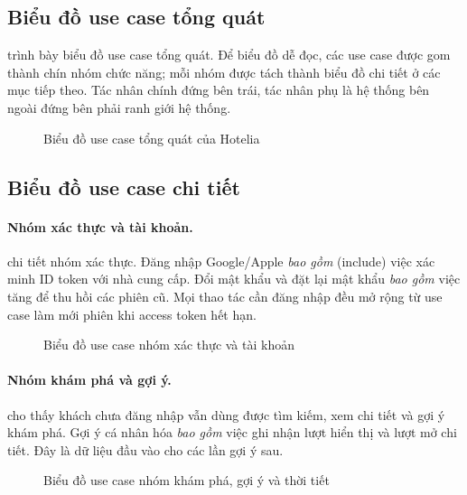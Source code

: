 \subsection{Biểu đồ use case tổng quát}

 trình bày biểu đồ use case tổng quát. Để biểu đồ dễ đọc, các use case được gom thành chín nhóm chức năng; mỗi nhóm được tách thành biểu đồ chi tiết ở các mục tiếp theo. Tác nhân chính đứng bên trái, tác nhân phụ là hệ thống bên ngoài đứng bên phải ranh giới hệ thống.

\begin{figure}[H]
\centering
{}
\caption{Biểu đồ use case tổng quát của Hotelia}\label{fig:uc-overall}
\end{figure}

\subsection{Biểu đồ use case chi tiết}

\paragraph{Nhóm xác thực và tài khoản.}  chi tiết nhóm xác thực. Đăng nhập Google/Apple \emph{bao gồm} (include) việc xác minh ID token với nhà cung cấp. Đổi mật khẩu và đặt lại mật khẩu \emph{bao gồm} việc tăng  để thu hồi các phiên cũ. Mọi thao tác cần đăng nhập đều mở rộng từ use case làm mới phiên khi access token hết hạn.

\begin{figure}[H]
\centering
{}
\caption{Biểu đồ use case nhóm xác thực và tài khoản}\label{fig:uc-auth}
\end{figure}

\paragraph{Nhóm khám phá và gợi ý.}  cho thấy khách chưa đăng nhập vẫn dùng được tìm kiếm, xem chi tiết và gợi ý khám phá. Gợi ý cá nhân hóa \emph{bao gồm} việc ghi nhận lượt hiển thị và lượt mở chi tiết. Đây là dữ liệu đầu vào cho các lần gợi ý sau.

\begin{figure}[H]
\centering
{}
\caption{Biểu đồ use case nhóm khám phá, gợi ý và thời tiết}\label{fig:uc-explore}
\end{figure}

